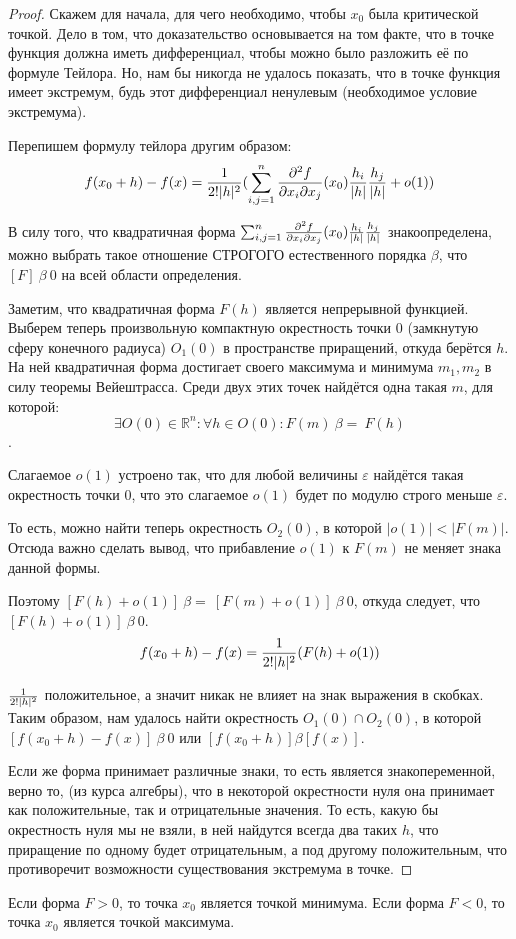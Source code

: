 \begin{proof}
Скажем для начала, для чего необходимо, чтобы $x_0$ была критической точкой. Дело в том, что доказательство основывается на том факте, что в точке функция должна иметь дифференциал, чтобы можно было разложить её по формуле Тейлора. Но, нам бы никогда не удалось показать, что в точке функция имеет экстремум, будь этот дифференциал ненулевым (необходимое условие экстремума).

Перепишем формулу тейлора другим образом:
$$f(x_0+h) - f(x) = {1 \over 2!|h|^2} (\sum_{i,j=1}^{n}{\partial^2 f \over \partial x_i \partial x_j}(x_0){h_i \over |h|} {h_j \over |h|}+o(1))$$

В силу того, что квадратичная форма $\sum_{i,j=1}^{n}{\partial^2 f \over \partial x_i \partial x_j}(x_0){h_i \over |h|} {h_j \over |h|}$ знакоопределена, можно выбрать такое отношение СТРОГОГО естественного порядка $\beta$, что $[F]\ \beta\ 0$ на всей области определения.

Заметим, что квадратичная форма $F(h)$  является непрерывной функцией. Выберем теперь произвольную компактную окрестность точки 0 (замкнутую сферу конечного радиуса) $O_1(0)$ в пространстве приращений, откуда берётся $h$. На ней квадратичная форма достигает своего максимума и минимума $m_1, m_2$ в силу теоремы Вейештрасса. Среди двух этих точек найдётся одна такая $m$, для которой: $$\exists O{(0)} \in \mathbb{R}^n: \forall h \in O{(0)}: F(m)\ {\beta=}\  F(h)$$. 


Слагаемое $o(1)$ устроено так, что для любой величины $\varepsilon$ найдётся такая окрестность точки $0$, что это слагаемое $o(1)$ будет по модулю строго меньше $\varepsilon$.

То есть, можно найти теперь окрестность $O_2(0)$, в которой $|o(1)| < |F(m)|$. Отсюда важно сделать вывод, что прибавление $o(1)$ к $F(m)$ не меняет знака данной формы.


Поэтому $[F(h) + o(1)]\ \beta=\ [F(m) + o(1)]\ \beta\ 0$, откуда следует, что $[F(h) + o(1)]\ \beta\ 0$.
$$f(x_0+h) - f(x) = {1 \over 2!|h|^2} (F(h)+o(1))$$

${1 \over 2!|h|^2}$ положительное, а значит никак не влияет на знак выражения в скобках.
Таким образом, нам удалось найти окрестность $O_1(0) \cap O_2(0)$, в которой $[f(x_0 + h) - f(x)]\ \beta\ 0$ или $[f(x_0 + h)] \beta [f(x)]$.

Если же форма принимает различные знаки, то есть является знакопеременной, верно то, (из курса алгебры), что в некоторой окрестности нуля она принимает как положительные, так и отрицательные значения. То есть, какую бы окрестность нуля мы не взяли, в ней найдутся всегда два таких $h$, что приращение по одному будет отрицательным, а под другому положительным, что противоречит возможности существования экстремума в точке.
\end{proof}
\begin{consequence}
Если форма $F > 0$, то точка $x_0$ является точкой минимума. Если форма $F < 0$, то точка $x_0$ является точкой максимума.
\end{consequence}
